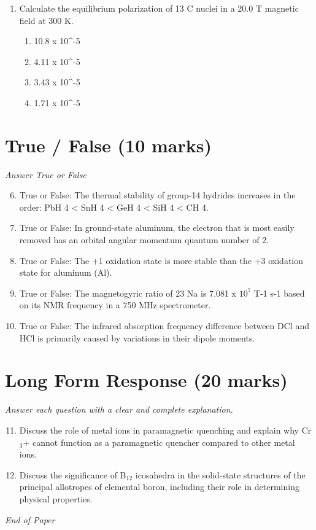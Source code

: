 \documentclass[12pt]{article}
\begin{document}
\begin{enumerate}[label=\arabic*.]
\begin{enumerate}[label=(\alph*)]
    \item The process does not involve any work.
    \item The entropy of the system increases.
    \item The total entropy of the system plus surroundings increases.
\end{enumerate}
\item Calculate the equilibrium polarization of 13 C nuclei in a 20.0 T magnetic field at 300 K.
\begin{enumerate}[label=(\alph*)]
    \item 10.8 x 10^-5
    \item 4.11 x 10^-5
    \item 3.43 x 10^-5
    \item 1.71 x 10^-5
\end{enumerate}
\end{enumerate}

\section*{True / False (10 marks)}
\textit{Answer True or False}
\begin{enumerate}[label=\arabic*.]
\setcounter{enumi}{5}
\item True or False: The thermal stability of group-14 hydrides increases in the order: PbH 4 \textless{} SnH 4 \textless{} GeH 4 \textless{} SiH 4 \textless{} CH 4.
\item True or False: In ground-state aluminum, the electron that is most easily removed has an orbital angular momentum quantum number of 2.
\item True or False: The +1 oxidation state is more stable than the +3 oxidation state for aluminum (Al).
\item True or False: The magnetogyric ratio of 23 Na is 7.081 x $10^7$ T-1 s-1 based on its NMR frequency in a 750 MHz spectrometer.
\item True or False: The infrared absorption frequency difference between DCl and HCl is primarily caused by variations in their dipole moments.
\end{enumerate}

\section*{Long Form Response (20 marks)}
\textit{Answer each question with a clear and complete explanation.}
\begin{enumerate}[label=\arabic*.]
\setcounter{enumi}{10}
\item Discuss the role of metal ions in paramagnetic quenching and explain why Cr$_{3}$+ cannot function as a paramagnetic quencher compared to other metal ions.
\item Discuss the significance of B$_{12}$ icosahedra in the solid-state structures of the principal allotropes of elemental boron, including their role in determining physical properties.
\end{enumerate}

\vfill
\noindent\textit{End of Paper}
\end{document}
